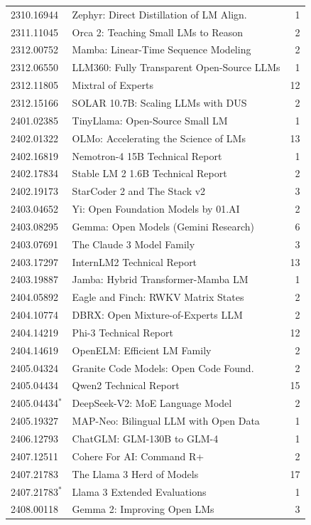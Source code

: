 \documentclass[11pt]{article}
\begin{document}
\begin{table}[t!]
\begin{tabular}{llr}
2310.16944 & Zephyr: Direct Distillation of LM Align. & 1 \\
2311.11045 & Orca 2: Teaching Small LMs to Reason & 2 \\
2312.00752 & Mamba: Linear-Time Sequence Modeling & 2 \\
2312.06550 & LLM360: Fully Transparent Open-Source LLMs & 1 \\
2312.11805 & Mixtral of Experts & 12 \\
2312.15166 & SOLAR 10.7B: Scaling LLMs with DUS & 2 \\
2401.02385 & TinyLlama: Open-Source Small LM & 1 \\
2402.01322 & OLMo: Accelerating the Science of LMs & 13 \\
2402.16819 & Nemotron-4 15B Technical Report & 1 \\
2402.17834 & Stable LM 2 1.6B Technical Report & 2 \\
2402.19173 & StarCoder 2 and The Stack v2 & 3 \\
2403.04652 & Yi: Open Foundation Models by 01.AI & 2 \\
2403.08295 & Gemma: Open Models (Gemini Research) & 6 \\
2403.07691 & The Claude 3 Model Family & 3 \\
2403.17297 & InternLM2 Technical Report & 13 \\
2403.19887 & Jamba: Hybrid Transformer-Mamba LM & 1 \\
2404.05892 & Eagle and Finch: RWKV Matrix States & 2 \\
2404.10774 & DBRX: Open Mixture-of-Experts LLM & 2 \\
2404.14219 & Phi-3 Technical Report & 12 \\
2404.14619 & OpenELM: Efficient LM Family & 2 \\
2405.04324 & Granite Code Models: Open Code Found. & 2 \\
2405.04434 & Qwen2 Technical Report & 15 \\
2405.04434$^*$ & DeepSeek-V2: MoE Language Model & 2 \\
2405.19327 & MAP-Neo: Bilingual LLM with Open Data & 1 \\
2406.12793 & ChatGLM: GLM-130B to GLM-4 & 1 \\
2407.12511 & Cohere For AI: Command R+ & 2 \\
2407.21783 & The Llama 3 Herd of Models & 17 \\
2407.21783$^*$ & Llama 3 Extended Evaluations & 1 \\
2408.00118 & Gemma 2: Improving Open LMs & 3 \\

\end{tabular}
\end{table}
\end{document}
